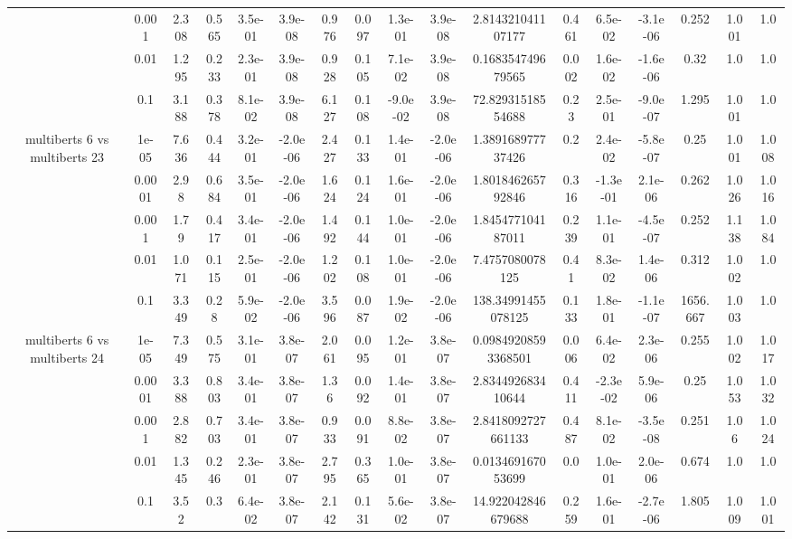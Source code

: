 \begin{tabular}{|c|c|c|c|c|c|c|c|c|c|c|c|c|c|c|c|c|}
 & 0.001 & 2.308 & 0.565 & 3.5e-01 & 3.9e-08 & 0.976 & 0.097 & 1.3e-01 & 3.9e-08 & 2.814321041107177 & 0.461 & 6.5e-02 & -3.1e-06 & 0.252 & 1.001 & 1.0 \\
 & 0.01 & 1.295 & 0.233 & 2.3e-01 & 3.9e-08 & 0.928 & 0.105 & 7.1e-02 & 3.9e-08 & 0.168354749679565 & 0.002 & 1.6e-02 & -1.6e-06 & 0.32 & 1.0 & 1.0 \\
 & 0.1 & 3.188 & 0.378 & 8.1e-02 & 3.9e-08 & 6.127 & 0.108 & -9.0e-02 & 3.9e-08 & 72.82931518554688 & 0.23 & 2.5e-01 & -9.0e-07 & 1.295 & 1.001 & 1.0 \\
\hline
\multirow{5}{*}{multiberts 6 vs multiberts 23} & 1e-05 & 7.636 & 0.444 & 3.2e-01 & -2.0e-06 & 2.427 & 0.133 & 1.4e-01 & -2.0e-06 & 1.389168977737426 & 0.2 & 2.4e-02 & -5.8e-07 & 0.25 & 1.001 & 1.008 \\
 & 0.0001 & 2.98 & 0.684 & 3.5e-01 & -2.0e-06 & 1.624 & 0.124 & 1.6e-01 & -2.0e-06 & 1.801846265792846 & 0.316 & -1.3e-01 & 2.1e-06 & 0.262 & 1.026 & 1.016 \\
 & 0.001 & 1.79 & 0.417 & 3.4e-01 & -2.0e-06 & 1.492 & 0.144 & 1.0e-01 & -2.0e-06 & 1.845477104187011 & 0.239 & 1.1e-01 & -4.5e-07 & 0.252 & 1.138 & 1.084 \\
 & 0.01 & 1.071 & 0.115 & 2.5e-01 & -2.0e-06 & 1.202 & 0.108 & 1.0e-01 & -2.0e-06 & 7.4757080078125 & 0.41 & 8.3e-02 & 1.4e-06 & 0.312 & 1.002 & 1.0 \\
 & 0.1 & 3.349 & 0.28 & 5.9e-02 & -2.0e-06 & 3.596 & 0.087 & 1.9e-02 & -2.0e-06 & 138.34991455078125 & 0.133 & 1.8e-01 & -1.1e-07 & 1656.667 & 1.003 & 1.0 \\
\hline
\multirow{5}{*}{multiberts 6 vs multiberts 24} & 1e-05 & 7.349 & 0.575 & 3.1e-01 & 3.8e-07 & 2.061 & 0.095 & 1.2e-01 & 3.8e-07 & 0.09849208593368501 & 0.006 & 6.4e-02 & 2.3e-06 & 0.255 & 1.002 & 1.017 \\
 & 0.0001 & 3.388 & 0.803 & 3.4e-01 & 3.8e-07 & 1.36 & 0.092 & 1.4e-01 & 3.8e-07 & 2.834492683410644 & 0.411 & -2.3e-02 & 5.9e-06 & 0.25 & 1.053 & 1.032 \\
 & 0.001 & 2.882 & 0.703 & 3.4e-01 & 3.8e-07 & 0.933 & 0.091 & 8.8e-02 & 3.8e-07 & 2.8418092727661133 & 0.487 & 8.1e-02 & -3.5e-08 & 0.251 & 1.06 & 1.024 \\
 & 0.01 & 1.345 & 0.246 & 2.3e-01 & 3.8e-07 & 2.795 & 0.365 & 1.0e-01 & 3.8e-07 & 0.013469167053699 & 0.0 & 1.0e-01 & 2.0e-06 & 0.674 & 1.0 & 1.0 \\
 & 0.1 & 3.52 & 0.3 & 6.4e-02 & 3.8e-07 & 2.142 & 0.131 & 5.6e-02 & 3.8e-07 & 14.922042846679688 & 0.259 & 1.6e-01 & -2.7e-06 & 1.805 & 1.009 & 1.001 \\

\end{tabular}
